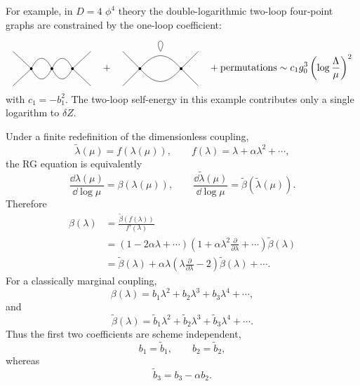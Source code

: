 For example, in \(D=4\) \(\phi^4\) theory the double-logarithmic two-loop
four-point graphs are constrained by the one-loop coefficient:
\[
\begin{tikzpicture}[baseline=-0.45ex,scale=0.82]
  \coordinate (A) at (-0.85,0);
  \coordinate (B) at (0.05,0);
  \coordinate (C) at (0.95,0);
  \draw (-1.65,0.75)--(A)--(-1.65,-0.75);
  \draw (1.75,0.75)--(C)--(1.75,-0.75);
  \draw (A) .. controls (-0.55,0.6) and (-0.25,0.6) .. (B);
  \draw (A) .. controls (-0.55,-0.6) and (-0.25,-0.6) .. (B);
  \draw (B) .. controls (0.35,0.6) and (0.65,0.6) .. (C);
  \draw (B) .. controls (0.35,-0.6) and (0.65,-0.6) .. (C);
  \fill (A) circle (1.7pt);
  \fill (B) circle (1.7pt);
  \fill (C) circle (1.7pt);
\end{tikzpicture}
\quad+\quad
\begin{tikzpicture}[baseline=-0.45ex,scale=0.82]
  \coordinate (A) at (-0.9,0);
  \coordinate (B) at (0.9,0);
  \draw (-1.65,0.75)--(A)--(-1.65,-0.75);
  \draw (1.65,0.75)--(B)--(1.65,-0.75);
  \draw (A) .. controls (-0.25,0.75) and (0.25,0.75) .. (B);
  \draw (A) .. controls (-0.25,-0.75) and (0.25,-0.75) .. (B);
  \draw (0,0.75) .. controls (0.35,1.35) and (-0.35,1.35) .. (0,0.75);
  \fill (A) circle (1.7pt);
  \fill (B) circle (1.7pt);
\end{tikzpicture}
\quad+\hbox{permutations}
\sim
c_1g_0^3\left(\log\frac{\Lambda}{\mu}\right)^2
\]
with \(c_1=-b_1^2\).  The two-loop self-energy in this example contributes
only a single logarithm to \(\delta Z\).

Under a finite redefinition of the dimensionless coupling,
\[
  \widetilde\lambda(\mu)=f(\lambda(\mu)),
  \qquad
  f(\lambda)=\lambda+\alpha\lambda^2+\cdots,
\]
the RG equation is equivalently
\[
  \frac{\dd\lambda(\mu)}{\dd\log\mu}=\beta(\lambda(\mu)),
  \qquad
  \frac{\dd\widetilde\lambda(\mu)}{\dd\log\mu}
  =
  \widetilde\beta(\widetilde\lambda(\mu)).
\]
Therefore
\[
\begin{split}
  \beta(\lambda)
  &=
  \frac{\widetilde\beta(f(\lambda))}{f'(\lambda)}
\\
  &=
  \left(1-2\alpha\lambda+\cdots\right)
  \left(1+\alpha\lambda^2\frac{\partial}{\partial\lambda}+\cdots\right)
  \widetilde\beta(\lambda)
\\
  &=
  \widetilde\beta(\lambda)
  +\alpha\lambda
  \left(\lambda\frac{\partial}{\partial\lambda}-2\right)
  \widetilde\beta(\lambda)+\cdots .
\end{split}
\]
For a classically marginal coupling,
\[
  \beta(\lambda)=b_1\lambda^2+b_2\lambda^3+b_3\lambda^4+\cdots,
\]
and
\[
  \widetilde\beta(\lambda)
  =
  \widetilde b_1\lambda^2
  +\widetilde b_2\lambda^3
  +\widetilde b_3\lambda^4+\cdots.
\]
Thus the first two coefficients are scheme independent,
\[
  b_1=\widetilde b_1,\qquad b_2=\widetilde b_2,
\]
whereas
\[
  \widetilde b_3=b_3-\alpha b_2.
\]

